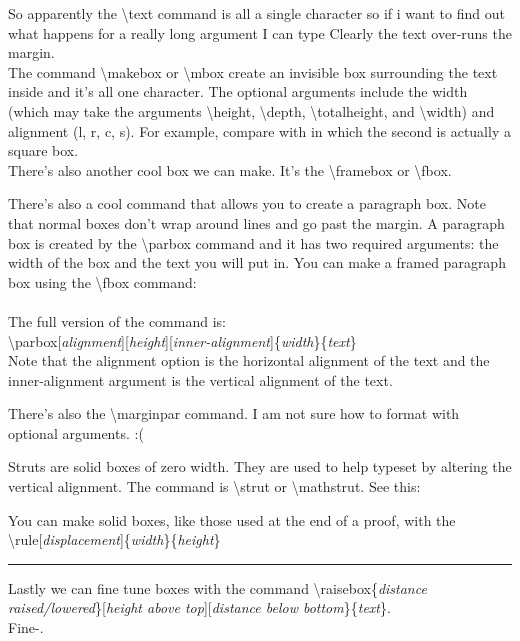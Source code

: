 \documentclass[12pt,draft]{amsart} %
\begin{document}
\vspace{12pt}
So apparently the \textbackslash text command is all a single character so if i want to find out what happens for a really long argument I can type  Clearly the text over-runs the margin. \\[12pt]
The command \textbackslash makebox or \textbackslash mbox create an invisible box surrounding the text inside and it's all one character. The optional arguments include the width (which may take the arguments \textbackslash height, \textbackslash depth, \textbackslash totalheight, and \textbackslash width) and alignment (l, r, c, s). For example, compare  with  in which the second is actually a square box. \\[12pt]
There's also another cool box we can make. It's the \textbackslash framebox or \textbackslash fbox. 

There's also a cool command that allows you to create a paragraph box. Note that normal boxes don't wrap around lines and go past the margin. A paragraph box is created by the \textbackslash parbox command and it has two required arguments: the width of the box and the text you will put in. You can make a framed paragraph box using the \textbackslash fbox command: \\
\\
The full version of the command is:\\ \textbackslash parbox[\emph{alignment}][\emph{height}][\emph{inner-alignment}]\{\emph{width}\}\{\emph{text}\} \vspace{12pt}\\
Note that the alignment option is the horizontal alignment of the text and the inner-alignment argument is the vertical alignment of the text.
\vspace{12pt}

\noindent There's also the \textbackslash marginpar command.  I am not sure how to format with optional arguments. :(
\vspace{12pt}

Struts are solid boxes of zero width. They are used to help typeset by altering the vertical alignment. The command is \textbackslash strut or \textbackslash mathstrut. See this:
 \quad {} \quad {} \quad {}
\vspace{12pt}

You can make solid boxes, like those used at the end of a proof, with the \textbackslash rule[\emph{displacement}]\{\emph{width}\}\{\emph{height}\} \rule[-.23ex]{1.6ex}{1.6ex}
\vspace{12pt}

Lastly we can fine tune boxes with the command \textbackslash raisebox\{\emph{distance raised/lowered}\}[\emph{height above top}][\emph{distance below bottom}\}\{\emph{text}\}. \\Fine-\raisebox{.5ex}{tun}\raisebox{-.5ex}{ing}.
\end{document}
